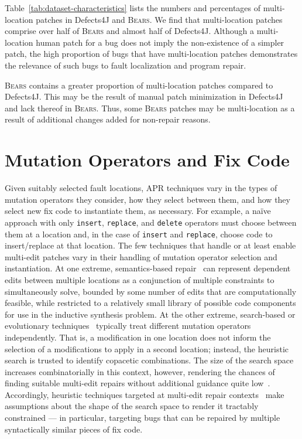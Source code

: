 \documentclass[10pt, conference]{IEEEtran}
\newcommand\bears{\textsc{Bears}\xspace}
\begin{document}
Table~\ref{tab:dataset-characteristics} lists the numbers and percentages of
multi-location patches in Defects4J and \bears. 
We find that multi-location patches comprise over half of \bears and almost half of Defects4J.
Although a multi-location human patch for a bug does not imply the 
non-existence of a simpler patch, the high proportion of bugs that have 
multi-location patches demonstrates the relevance of such bugs to fault localization and
program repair. 

\bears contains a greater proportion of 
multi-location patches compared to Defects4J. This may be the 
result of manual patch minimization in Defects4J~\cite{defects4j} 
and lack thereof in \bears.
Thus, some \bears patches may be multi-location as a result of additional 
changes added for non-repair reasons.






\section{Mutation Operators and Fix Code}
\label{sec:mutops}

Given suitably selected fault locations, APR techniques vary in the types of
mutation operators they consider, how they select between them, and how they
select new fix code to instantiate them, as necessary.  For example, a na{\"i}ve
approach with only \texttt{insert}, \texttt{replace}, and \texttt{delete}
operators must choose between them at a location and, in the case of
\texttt{insert} and \texttt{replace}, choose code to insert/replace at that
location.  
%
The few techniques that handle or at least enable multi-edit patches vary in their
handling of mutation operator selection and instantiation.  At one
extreme, semantics-based repair~\cite{s3,angelix} can represent dependent edits between multiple
locations as a conjunction of multiple constraints to simultaneously solve,
bounded by some number of edits that are computationally feasible, while
restricted to a relatively small library of possible code components for use in
the inductive synthesis problem.    At the other extreme, search-based or
evolutionary techniques~\cite{genprog,par} typically treat different mutation
operators independently.  That is, a modification in one location does not
inform the selection of a modifications to apply in a second location; instead,
the heuristic search is trusted to identify copacetic combinations.  The size of
the search space increases combinatorially in this context, however, rendering
the chances of finding suitable multi-edit repairs without additional guidance
quite low~\cite{ae,long-search-spaces}. Accordingly, heuristic techniques targeted at multi-edit
repair contexts~\cite{saha2019harnessing} make assumptions about the
shape of the search space to render it tractably constrained --- in particular,
targeting bugs that can be repaired by multiple syntactically similar pieces of
fix code.
\end{document}
